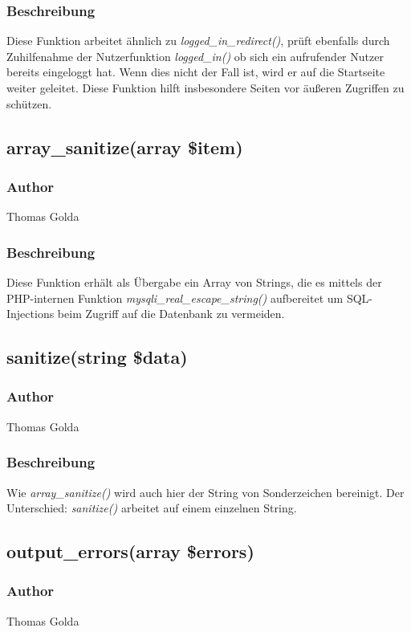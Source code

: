 \documentclass[fontsize = 12pt, paper = a4]{scrreprt}
\begin{document}
\subsubsection*{Beschreibung}
Diese Funktion arbeitet ähnlich zu \textit{logged\_in\_redirect()}, prüft ebenfalls durch Zuhilfenahme der Nutzerfunktion \textit{logged\_in()} ob sich ein aufrufender Nutzer bereits eingeloggt hat. Wenn dies nicht der Fall ist, wird er auf die Startseite weiter geleitet. Diese Funktion hilft insbesondere Seiten vor äußeren Zugriffen zu schützen.


\subsection*{array\_sanitize(array \$item)}
\subsubsection*{Author}
Thomas Golda
\subsubsection*{Beschreibung}
Diese Funktion erhält als Übergabe ein Array von Strings, die es mittels der PHP-internen Funktion \textit{mysqli\_real\_escape\_string()} aufbereitet um SQL-Injections beim Zugriff auf die Datenbank zu vermeiden.


\subsection*{sanitize(string \$data)}
\subsubsection*{Author}
Thomas Golda
\subsubsection*{Beschreibung}
Wie \textit{array\_sanitize()} wird auch hier der String von Sonderzeichen bereinigt. Der Unterschied: \textit{sanitize()} arbeitet auf einem einzelnen 
String.


\subsection*{output\_errors(array \$errors)}
\subsubsection*{Author}
Thomas Golda
\end{document}
